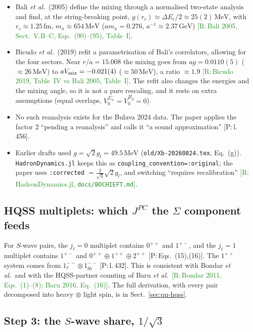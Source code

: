 \documentclass[11pt,a4paper]{article}
\newcommand{\tagP}[1]{\textcolor{blue!65!black}{\textsf{\small[P:\,#1]}}}
\newcommand{\tagR}[1]{\textcolor{ForestGreen}{\textsf{\small[R:\,#1]}}}
\newcommand{\GeV}{\,\mathrm{GeV}}
\newcommand{\MeV}{\,\mathrm{MeV}}
\newcommand{\fm}{\,\mathrm{fm}}
\begin{document}
\begin{warnbox}
\begin{itemize}
\item Bali \emph{et al.}\ (2005) define the mixing through a normalised two-state analysis and find, at the string-breaking point, $g(r_c)\approx\Delta E_c/2\approx25(2)\MeV$, with $r_c\approx1.25\fm$, $m_\pi\approx654\MeV$ ($am_\pi=0.276$, $a^{-1}\approx2.37\GeV$) \tagR{Bali 2005, Sect.~V.B--C, Eqs.~(90)--(95), Table~I}.
\item Bicudo \emph{et al.}\ (2019) refit a parametrisation of Bali's correlators, allowing for the four sectors. Near $r/a=15.008$ the mixing goes from $ag=0.0110(5)$ ($\approx26\MeV$) to $aV_{\rm mix}=-0.021(4)$ ($\approx50\MeV$), a ratio $\approx1.9$ \tagR{Bicudo 2019, Table~IV vs Bali 2005, Table~I}. The refit also changes the energies and the mixing angle, so it is not a pure rescaling, and it rests on extra assumptions (equal overlaps, $V_0^{\Sigma_u^-}=V_0^{\Pi_g}=0$).
\item No such reanalysis exists for the Bulava 2024 data. The paper applies the factor 2 ``pending a reanalysis'' and calls it ``a sound approximation'' \tagP{l.\,456}.
\item Earlier drafts used $g=\sqrt2g_l=49.5\MeV$ (\texttt{old/Xb-20260824.tex}, Eq.~(g)). \texttt{HadronDynamics.jl} keeps this as \texttt{coupling\_convention=:original}; the paper uses \texttt{:corrected} $=\frac{2}{\sqrt3}\sqrt2g_l$, and switching ``requires recalibration'' \tagR{HadronDynamics.jl, \texttt{docs/BOCHIEFT.md}}.
\end{itemize}
\end{warnbox}

\subsection{HQSS multiplets: which $J^{PC}$ the $\Sigma$ component feeds}
For $S$-wave pairs, the $j_\ell=0$ multiplet contains $0^{++}$ and $1^{+-}$, and the $j_\ell=1$ multiplet contains $1^{+-}$ and $0^{++}\oplus1^{++}\oplus2^{++}$ \tagP{Eqs.~(15),(16)}. The $1^{++}$ system comes from $1_\ell^{--}\otimes1_{\bar bb}^{--}$ \tagP{l.\,432}. This is consistent with Bondar \emph{et al.}\ and with the HQSS-partner counting of Baru \emph{et al.}\ \tagR{Bondar 2011, Eqs.~(1)--(8); Baru 2016, Eq.~(16)}. The full derivation, with every pair decomposed into heavy $\otimes$ light spin, is in Sect.~\ref{sec:qn-hqss}.

\subsection{Step 3: the $S$-wave share, $1/\sqrt3$}
\end{document}
